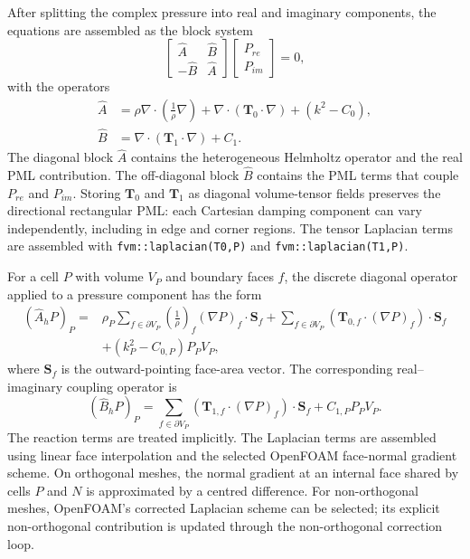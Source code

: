 \documentclass[final,num,12pt]{elsarticle}
\newcommand{\Sf}{\mathbf{S}_f}
\begin{document}
After splitting the complex pressure into real and imaginary components, the
equations are assembled as the block system
\begin{equation}
\begin{bmatrix}
    \hat A & \hat B \\
    -\hat B & \hat A
\end{bmatrix}
\begin{bmatrix}
    P_{re} \\ P_{im} 
\end{bmatrix}
=0,
\label{eq:blockCoupled}
\end{equation}
with the operators
\begin{equation}
    \begin{aligned}
        \hat A & =
        \rho \nabla\cdot\left(\frac{1}{\rho}\nabla\right)
        + \nabla\cdot(\mathbf{T}_0\cdot\nabla)
        + \left(k^2-C_0\right),\\
        \hat B & =
        \nabla\cdot(\mathbf{T}_1\cdot\nabla) + C_1 .
    \end{aligned}
\label{eq:blockOperators}
\end{equation}
The diagonal block $\hat A$ contains the heterogeneous Helmholtz operator and
the real PML contribution.  The off-diagonal block $\hat B$ contains the PML
terms that couple $P_{re}$ and $P_{im}$.  Storing $\mathbf{T}_0$ and
$\mathbf{T}_1$ as diagonal volume-tensor fields preserves the directional
rectangular PML: each Cartesian damping component can vary independently,
including in edge and corner regions.  The tensor Laplacian terms are assembled
with \texttt{fvm::laplacian(T0,P)} and \texttt{fvm::laplacian(T1,P)}.

For a cell $P$ with volume $V_P$ and boundary faces $f$, the discrete diagonal
operator applied to a pressure component has the form
\begin{equation}
\begin{aligned}
    (\hat A_h P)_P ={}&
    \rho_P \sum_{f\in\partial V_P}
        \left(\frac{1}{\rho}\right)_f
        (\nabla P)_f\cdot\Sf
    + \sum_{f\in\partial V_P}
        \left(\mathbf{T}_{0,f}\cdot(\nabla P)_f\right)\cdot\Sf \\
    &+ (k_P^2-C_{0,P})P_P V_P ,
\end{aligned}
\label{eq:discreteDiagonalOperator}
\end{equation}
where $\Sf$ is the outward-pointing face-area vector.  The corresponding
real--imaginary coupling operator is
\begin{equation}
    (\hat B_h P)_P =
    \sum_{f\in\partial V_P}
        \left(\mathbf{T}_{1,f}\cdot(\nabla P)_f\right)\cdot\Sf
    + C_{1,P}P_P V_P .
\label{eq:discreteCouplingOperator}
\end{equation}
The reaction terms are treated implicitly.  The Laplacian terms are assembled
using linear face interpolation and the selected OpenFOAM face-normal gradient
scheme.  On orthogonal meshes, the normal gradient at an internal face shared
by cells $P$ and $N$ is approximated by a centred difference.  For
non-orthogonal meshes, OpenFOAM's corrected Laplacian scheme can be selected;
its explicit non-orthogonal contribution is updated through the non-orthogonal
correction loop.
\end{document}
